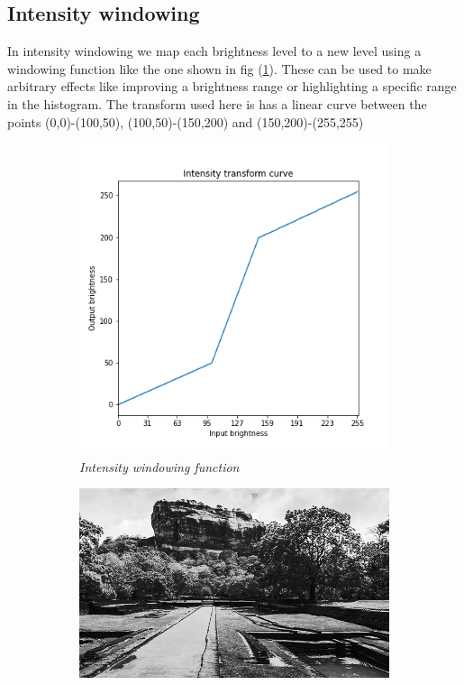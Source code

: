 \documentclass[11pt, a4paper]{article}
\begin{document}
\subsection{Intensity windowing}
\begin{minipage}{.4\textwidth}
In intensity windowing we map each brightness level to a new level using a windowing function like the one shown in fig (\ref{fig:Intensity Windowing}). These can be used to make arbitrary effects like improving a brightness range or highlighting a specific range in the histogram. The transform used here is has a linear curve between the points (0,0)-(100,50), (100,50)-(150,200) and (150,200)-(255,255) 
\end{minipage}
\hfill
\begin{minipage}{.6\textwidth}
\begin{figure}[H]
	\centering
	\begin{subfigure}[b]{0.39\textwidth}
		\centering
		\includegraphics[width=\textwidth]{./Outputs/Intensity_Transform.png}
		\caption{{\small \textit{Intensity windowing function}}}
		\label{fig:Intensity Windowing}
	\end{subfigure}
	\hfill
	\begin{subfigure}[b]{0.59\textwidth}
		\centering
		\includegraphics[width=\textwidth]{./Outputs/Intensity_Image.png}

\end{subfigure}
\end{figure}
\end{minipage}
\end{document}
